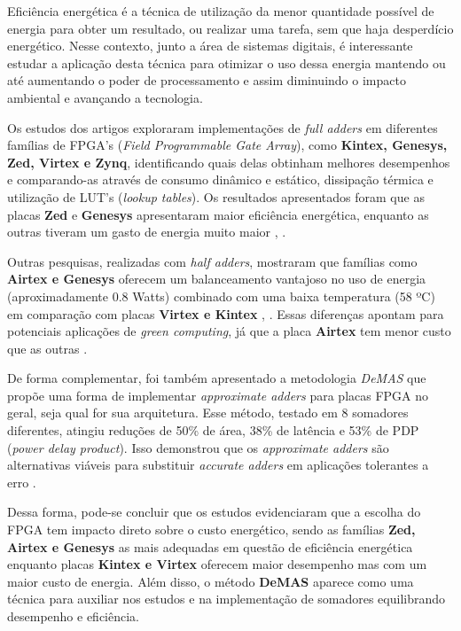 \documentclass{article}
\begin{document}
Eficiência energética é a técnica de utilização da menor quantidade possível de energia para obter um resultado, ou realizar uma tarefa, sem que haja desperdício energético. Nesse contexto, junto a área de sistemas digitais, é interessante estudar a aplicação desta técnica para otimizar o uso dessa energia mantendo ou até aumentando o poder de processamento e assim diminuindo o impacto ambiental e avançando a tecnologia.

Os estudos dos artigos exploraram implementações de \textit{full adders} em diferentes famílias de FPGA's (\textit{Field Programmable Gate Array}), como \textbf{Kintex, Genesys, Zed, Virtex e Zynq}, identificando quais delas obtinham melhores desempenhos e comparando-as através de consumo dinâmico e estático, dissipação térmica e utilização de LUT's (\textit{lookup tables}). Os resultados apresentados foram que as placas \textbf{Zed} e \textbf{Genesys} apresentaram maior eficiência energética, enquanto as outras tiveram um gasto de energia muito maior \cite{art1}, \cite{art2}.

Outras pesquisas, realizadas com \textit{half adders}, mostraram que famílias como \textbf{Airtex e Genesys} oferecem um balanceamento vantajoso no uso de energia (aproximadamente 0.8 Watts) combinado com uma baixa temperatura (58 ºC) em comparação com placas \textbf{Virtex e Kintex} \cite{art3}, \cite{art5}. Essas diferenças apontam para potenciais aplicações de \textit{green computing}, já que a placa \textbf{Airtex} tem menor custo que as outras \cite{art3}.

De forma complementar, foi também apresentado a metodologia \textit{DeMAS} que propõe uma forma de implementar \textit{approximate adders} para placas FPGA no geral, seja qual for sua arquitetura. Esse método, testado em 8 somadores diferentes, atingiu reduções de 50\% de área, 38\% de latência e 53\% de PDP (\textit{power delay product}). Isso demonstrou que os \textit{approximate adders} são alternativas viáveis para substituir \textit{accurate adders} em aplicações tolerantes a erro \cite{art4}.

Dessa forma, pode-se concluir que os estudos evidenciaram que a escolha do FPGA tem impacto direto sobre o custo energético, sendo as famílias \textbf{Zed, Airtex e Genesys} as mais adequadas em questão de eficiência energética enquanto placas \textbf{Kintex e Virtex} oferecem maior desempenho mas com um maior custo de energia. Além disso, o método \textbf{DeMAS} aparece como uma técnica para auxiliar nos estudos e na implementação de somadores equilibrando desempenho e eficiência.
\end{document}
